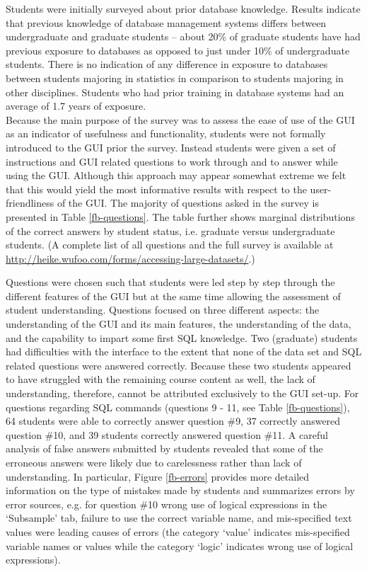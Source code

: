 \documentclass[11pt]{tise_style}
\begin{document}
Students were initially surveyed about prior database knowledge. Results indicate that previous knowledge of database management systems differs between undergraduate and graduate students -- about 20\% of graduate students have had previous exposure to databases as opposed to just under 10\% of undergraduate students. There is no indication of any difference in exposure to databases between students majoring in statistics in comparison to students majoring in other disciplines. Students who had prior training in database systems had an average of 1.7 years of exposure. \\
Because the main purpose of the survey was to assess the ease of use of the GUI as an indicator of usefulness and functionality, students were not formally introduced to the GUI prior the survey. Instead students were given a set of instructions and GUI related questions to work through and to answer while using the GUI. Although this approach may appear somewhat extreme we felt that this would yield the most informative results with respect to the user-friendliness of the GUI.  The majority of questions asked in the survey is presented in Table \ref{fb-questions}. The table further shows marginal distributions of the correct answers by student status, i.e. graduate versus undergraduate students. (A complete list of all questions and the full survey is available at \url{http://heike.wufoo.com/forms/accessing-large-datasets/}.)

Questions were chosen such that students were led step by step through the different features of the GUI but at the same time allowing the assessment of student understanding. Questions focused on three different aspects: the understanding of the GUI and its main features, the understanding of the data, and the capability to impart some first SQL knowledge.  Two (graduate) students had difficulties with the interface to the extent that none of the data set and SQL related questions were answered correctly. Because these two students appeared to have struggled with the remaining course content as well, the lack of understanding, therefore, cannot be attributed exclusively to the GUI set-up. For questions regarding SQL commands (questions 9 - 11, see Table \ref{fb-questions}), 64 students were able to correctly answer question \#9, 37 correctly answered question \#10, and 39 students correctly answered question \#11. A careful analysis of false answers submitted by students revealed that some of the erroneous answers were likely due to carelessness rather than lack of understanding. In particular, Figure \ref{fb-errors} provides more detailed information on the type of mistakes made by students and summarizes errors by error sources, e.g. for question \#10 wrong use of logical expressions in the `Subsample' tab, failure to use the correct variable name, and mis-specified text values were leading causes of errors (the category `value' indicates mis-specified variable names or values while the category `logic' indicates wrong use of logical expressions).  
\end{document}
